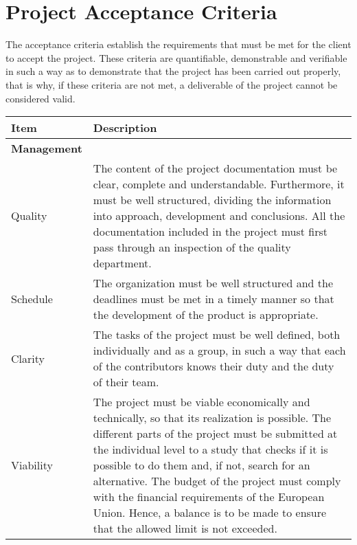 \section{Project Acceptance Criteria}

The acceptance criteria establish the requirements that must be met for the client to accept the project. These criteria are quantifiable, demonstrable and verifiable in such a way as to demonstrate that the project has been carried out properly, that is why, if these criteria are not met, a deliverable of the project cannot be considered valid.

\begin{longtable}[H]{lp{10.2cm}}
	
	\toprule[2pt]
	
	\textbf{Item} & \textbf{Description} \\
	
	\midrule[1.5pt] 
	\endhead
	
	\textbf{Management} & \vspace{0.2cm} \\

	\midrule
	
	Quality & The content of the project documentation must be clear, complete and understandable. Furthermore, it must be well structured, dividing the information into approach, development and conclusions.\vspace{0.2cm}
	\newline
	All the documentation included in the project must first pass through an inspection of the quality department.\vspace{0.2cm} \\

	\midrule	
	
	Schedule & The organization must be well structured and the deadlines must be met in a timely manner so that the development of the product is appropriate.\vspace{0.2cm} \\
	
	\midrule
	
	Clarity & The tasks of the project must be well defined, both individually and as a group, in such a way that each of the contributors knows their duty and the duty of their team.\vspace{0.2cm} \\
	
	\midrule
	
	Viability & The project must be viable economically and technically, so that its realization is possible.\vspace{0.2cm}
	\newline
	The different parts of the project must be submitted at the individual level to a study that checks if it is possible to do them and, if not, search for an alternative.\vspace{0.2cm}
	\newline
	The budget of the project must comply with the financial requirements of the European Union. Hence, a balance is to be made to ensure that the allowed limit is not exceeded.\vspace{0.2cm}\\
	

\end{longtable}
